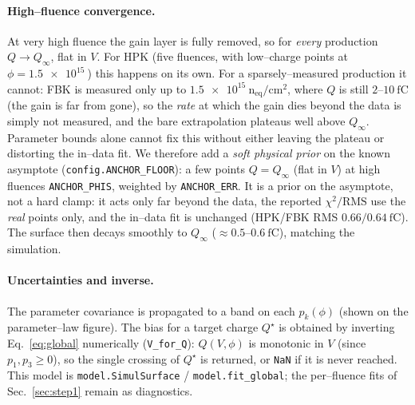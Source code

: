 \documentclass[11pt]{article}
\newcommand{\neqcm}{\ensuremath{\mathrm{n_{eq}/cm^{2}}}}
\newcommand{\fC}{\ensuremath{\mathrm{fC}}}
\newcommand{\code}[1]{\texttt{#1}}
\begin{document}
\paragraph{High--fluence convergence.} At very high fluence the gain layer is fully
removed, so for \emph{every} production $Q\to Q_\infty$, flat in $V$. For HPK (five
fluences, with low--charge points at $\phi=\SI{1.5e15}{}$) this happens on its own.
For a sparsely--measured production it cannot: FBK is measured only up to
$\SI{1.5e15}{\neqcm}$, where $Q$ is still $2$--$\SI{10}{\fC}$ (the gain is far from
gone), so the \emph{rate} at which the gain dies beyond the data is simply not
measured, and the bare extrapolation plateaus well above $Q_\infty$. Parameter
bounds alone cannot fix this without either leaving the plateau or distorting the
in--data fit. We therefore add a \emph{soft physical prior} on the known asymptote
(\code{config.ANCHOR\_FLOOR}): a few points $Q=Q_\infty$ (flat in $V$) at high
fluences \code{ANCHOR\_PHIS}, weighted by \code{ANCHOR\_ERR}. It is a prior on the
asymptote, not a hard clamp: it acts only far beyond the data, the reported
$\chi^2/\mathrm{RMS}$ use the \emph{real} points only, and the in--data fit is
unchanged (HPK/FBK RMS $0.66/\SI{0.64}{\fC}$). The surface then decays smoothly to
$Q_\infty$ ($\approx0.5$--$\SI{0.6}{\fC}$), matching the simulation.

\paragraph{Uncertainties and inverse.} The parameter covariance is propagated to a
band on each $p_k(\phi)$ (shown on the parameter--law figure). The bias for a target
charge $Q^\star$ is obtained by inverting Eq.~\ref{eq:global} numerically
(\code{V\_for\_Q}): $Q(V,\phi)$ is monotonic in $V$ (since $p_1,p_3\ge0$), so the
single crossing of $Q^\star$ is returned, or \code{NaN} if it is never reached.
This model is \code{model.SimulSurface} / \code{model.fit\_global}; the
per--fluence fits of Sec.~\ref{sec:step1} remain as diagnostics.
\end{document}
